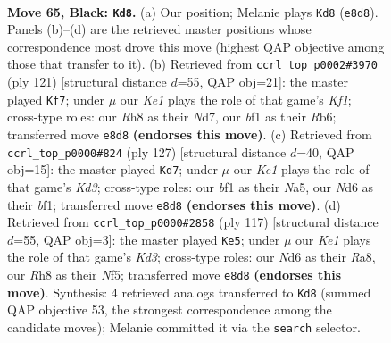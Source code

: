 \documentclass[11pt]{article}
\begin{document}
\clearpage

\begin{figure}[p]\centering
\begin{subfigure}{0.46\textwidth}\centering
\resizebox{\linewidth}{!}{%
\newchessgame
\chessboard[
  setfen={4k2r/R6p/P2n4/8/2P5/2p3KP/2P3P1/5B2 b - - 0 65},
  showmover=false,
  pgfstyle=straightmove, color=movearrow, markmove={e8-d8}
]}
\caption{}
\end{subfigure}\hfill
\begin{subfigure}{0.46\textwidth}\centering
\resizebox{\linewidth}{!}{%
\newchessgame
\chessboard[
  setfen={5k2/3n4/1r5p/6pP/6N1/R5P1/5PK1/8 b - - 10 61},
  showmover=false,
  pgfstyle=straightmove, color=movearrow, markmove={f8-f7}
]}
\caption{}
\end{subfigure}
\\[4pt]
\begin{subfigure}{0.46\textwidth}\centering
\resizebox{\linewidth}{!}{%
\newchessgame
\chessboard[
  setfen={7R/8/1p1k4/nP6/2pr4/5P1P/6P1/5BK1 b - - 4 64},
  showmover=false,
  pgfstyle=straightmove, color=movearrow, markmove={d6-d7}
]}
\caption{}
\end{subfigure}\hfill
\begin{subfigure}{0.46\textwidth}\centering
\resizebox{\linewidth}{!}{%
\newchessgame
\chessboard[
  setfen={r7/8/3k4/5n2/P6p/2P5/1P1R3P/2K5 b - - 2 59},
  showmover=false,
  pgfstyle=straightmove, color=movearrow, markmove={d6-e5}
]}
\caption{}
\end{subfigure}
\caption{\textbf{Move 65, Black: \texttt{Kd8}.} (a) Our position; Melanie plays \texttt{Kd8} (\texttt{e8d8}). Panels (b)--(d) are the retrieved master positions whose correspondence most drove this move (highest QAP objective among those that transfer to it). (b) Retrieved from \texttt{ccrl\_top\_p0002\#3970} (ply 121) [structural distance $d$=55, QAP obj=21]: the master played \texttt{Kf7}; under $\mu$ our \emph{Ke1} plays the role of that game's \emph{Kf1}; cross-type roles: our \emph{R}h8 as their \emph{N}d7, our \emph{b}f1 as their \emph{R}b6; transferred move \texttt{e8d8} \textbf{(endorses this move)}. (c) Retrieved from \texttt{ccrl\_top\_p0000\#824} (ply 127) [structural distance $d$=40, QAP obj=15]: the master played \texttt{Kd7}; under $\mu$ our \emph{Ke1} plays the role of that game's \emph{Kd3}; cross-type roles: our \emph{b}f1 as their \emph{N}a5, our \emph{N}d6 as their \emph{b}f1; transferred move \texttt{e8d8} \textbf{(endorses this move)}. (d) Retrieved from \texttt{ccrl\_top\_p0000\#2858} (ply 117) [structural distance $d$=55, QAP obj=3]: the master played \texttt{Ke5}; under $\mu$ our \emph{Ke1} plays the role of that game's \emph{Kd3}; cross-type roles: our \emph{N}d6 as their \emph{R}a8, our \emph{R}h8 as their \emph{N}f5; transferred move \texttt{e8d8} \textbf{(endorses this move)}. Synthesis: 4 retrieved analogs transferred to \texttt{Kd8} (summed QAP objective 53, the strongest correspondence among the candidate moves); Melanie committed it via the \texttt{search} selector.}
\label{fig:thought-m129}
\end{figure}
\end{document}
